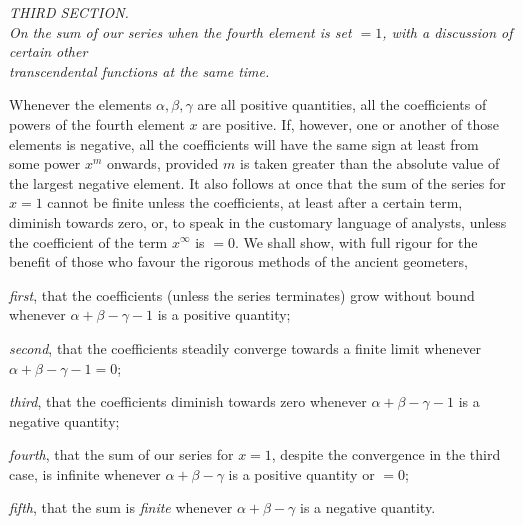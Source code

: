 \par{}\begin{center}
\textit{THIRD SECTION.}\\[6pt]
\textit{On the sum of our series when the fourth element is set $=1$, with a discussion of certain other}\\
\textit{transcendental functions at the same time.}\\[6pt]
\end{center}

Whenever the elements $\alpha,\beta,\gamma$ are all positive quantities, all the coefficients of powers of the fourth element $x$ are positive. If, however, one or another of those elements is negative, all the coefficients will have the same sign at least from some power $x^m$ onwards, provided $m$ is taken greater than the absolute value of the largest negative element. It also follows at once that the sum of the series for
$x=1$ cannot be finite unless the coefficients, at least after a certain term, diminish towards zero, or, to speak in the customary language of analysts, unless the coefficient of the term $x^{\infty}$ is $=0$. We shall show, with full rigour for the benefit of those who favour the rigorous methods of the ancient geometers,

\textit{first}, that the coefficients (unless the series terminates) grow without bound whenever $\alpha+\beta-\gamma-1$ is a positive quantity;

\textit{second}, that the coefficients steadily converge towards a finite limit whenever $\alpha+\beta-\gamma-1=0$;

\textit{third}, that the coefficients diminish towards zero whenever $\alpha+\beta-\gamma-1$ is a negative quantity;

\textit{fourth}, that the sum of our series for $x=1$, despite the convergence in the third case, is infinite whenever $\alpha+\beta-\gamma$ is a positive quantity or $=0$;

\textit{fifth}, that the sum is \textit{finite} whenever $\alpha+\beta-\gamma$ is a negative quantity.

